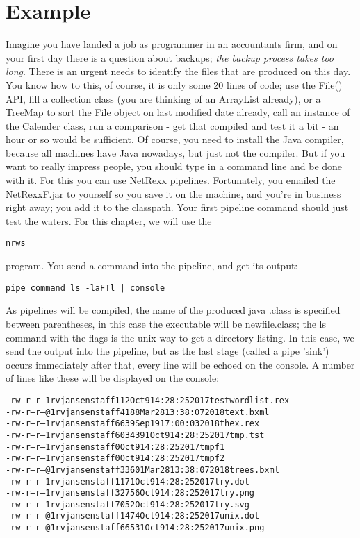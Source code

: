 \chapter{Example}
Imagine you have landed a job as programmer in an accountants firm,
and on your first day there is a question about backups; \emph{the backup
process takes too long}. There is an urgent needs to identify the files that are produced on this day. You know how to this, of course, it is only some 20 lines of code; use the File() API, fill a collection class (you are thinking of an ArrayList already), or a TreeMap to sort the File object on last modified date already, call an instance of the Calender class, run a comparison - get that compiled and test it a bit - an hour or so would be sufficient. Of course, you need to install the Java compiler, because all machines have Java nowadays, but just not the compiler.
But if you want to really impress people, you should type in a command line and be done with it. For this you can use NetRexx pipelines. Fortunately, you emailed the NetRexxF.jar to yourself so you save it on the machine, and you're in business right away; you add it to the classpath.
Your first pipeline command should just test the waters. For this
chapter, we will use the \begin{alltt}nrws\end{alltt} program. You send a
command into the pipeline, and get its output:
\begin{lstlisting}
pipe command ls -laFTl | console
\end{lstlisting}
As pipelines will be compiled, the name of the produced java .class is specified between parentheses, in this case the executable will be newfile.class; the ls command with the flags is the unix way to get a directory listing. In this case, we send the output into the pipeline, but as the last stage (called a pipe 'sink') occurs immediately after that, every line will be echoed on the console.
A number of lines like these will be displayed on the console:
\begin{alltt}
-rw-r--r-- 1 rvjansen staff 112 Oct 9 14:28:25 2017 testwordlist.rex
-rw-r--r--@ 1 rvjansen staff 4188 Mar 28 13:38:07 2018 text.bxml
-rw-r--r-- 1 rvjansen staff 6639 Sep 19 17:00:03 2018 thex.rex
-rw-r--r-- 1 rvjansen staff 6034391 Oct 9 14:28:25 2017 tmp.tst
-rw-r--r-- 1 rvjansen staff 0 Oct 9 14:28:25 2017 tmpf1
-rw-r--r-- 1 rvjansen staff 0 Oct 9 14:28:25 2017 tmpf2
-rw-r--r--@ 1 rvjansen staff 33601 Mar 28 13:38:07 2018 trees.bxml
-rw-r--r-- 1 rvjansen staff 1171 Oct 9 14:28:25 2017 try.dot
-rw-r--r-- 1 rvjansen staff 32756 Oct 9 14:28:25 2017 try.png
-rw-r--r-- 1 rvjansen staff 7052 Oct 9 14:28:25 2017 try.svg
-rw-r--r--@ 1 rvjansen staff 1474 Oct 9 14:28:25 2017 unix.dot
-rw-r--r--@ 1 rvjansen staff 66531 Oct 9 14:28:25 2017 unix.png
\end{alltt}
